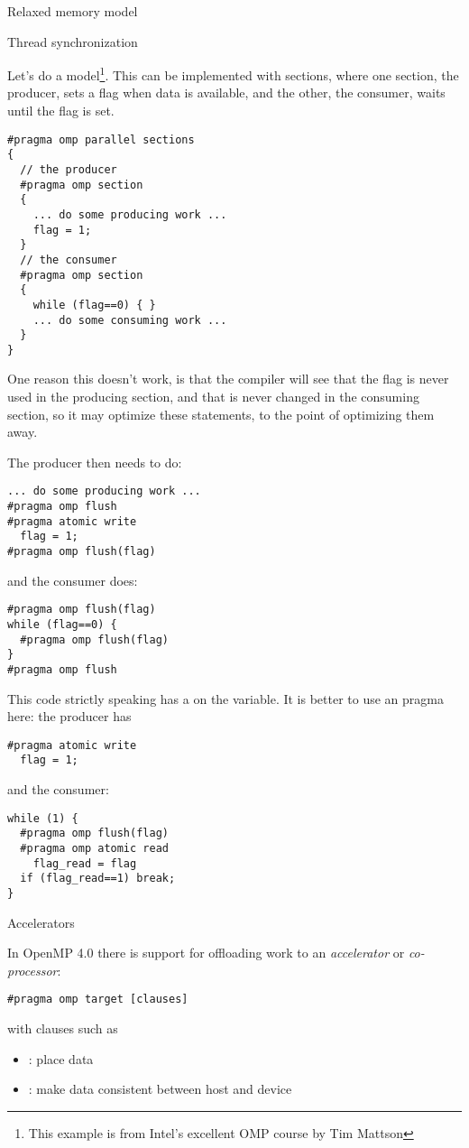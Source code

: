 
 {Relaxed memory model}

 {Thread synchronization}

Let's do a  model\footnote{This example
  is from Intel's excellent OMP course by Tim Mattson}.  This can be
implemented with sections, where one section, the producer, sets a
flag when data is available, and the other, the consumer, waits until
the flag is set.
\begin{verbatim}
#pragma omp parallel sections
{
  // the producer
  #pragma omp section
  {
    ... do some producing work ...
    flag = 1;
  }
  // the consumer
  #pragma omp section
  {
    while (flag==0) { }
    ... do some consuming work ...
  }
}
\end{verbatim}
One reason this doesn't work, is that the compiler will see that the flag is never used
in the producing section, and that is never changed in the consuming section, so
it may optimize these statements, to the point of optimizing them away.

The producer then needs to do:
\begin{verbatim}
... do some producing work ...
#pragma omp flush
#pragma atomic write
  flag = 1;
#pragma omp flush(flag)
\end{verbatim}
and the consumer does:
\begin{verbatim}
#pragma omp flush(flag)
while (flag==0) {
  #pragma omp flush(flag)
}
#pragma omp flush
\end{verbatim}
This code strictly speaking has a  on the  variable.
It is better to use an  pragma here: the producer has
\begin{verbatim}
#pragma atomic write
  flag = 1;
\end{verbatim}
and the consumer:
\begin{verbatim}
while (1) {
  #pragma omp flush(flag)
  #pragma omp atomic read
    flag_read = flag
  if (flag_read==1) break;
}
\end{verbatim}

 {Accelerators}

In OpenMP 4.0 there is support for offloading work to an
\emph{accelerator}
or
\emph{co-processor}:
\begin{verbatim}
#pragma omp target [clauses]
\end{verbatim}
with clauses such as
\begin{itemize}
\item {}: place data
\item {}: make data consistent between host and device
\end{itemize}

